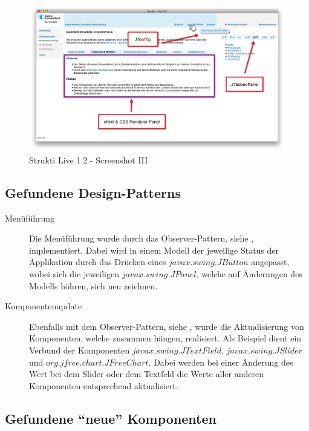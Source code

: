   \begin{figure}[htb]
    \begin{center}
      \includegraphics[width=\textwidth]{./image/SL/SL-03.png}
      \caption{Strukti Live 1.2 - Screenshot III}
      \label{img:SL-03}
    \end{center}
  \end{figure}
  
  \subsection{Gefundene Design-Patterns}
  
  \begin{description}
    \item[Menüführung]
    Die Menüführung wurde durch das Observer-Pattern, siehe
    \cite{ObserverDesignPattern}, implementiert. Dabei wird in einem Modell
    der jeweilige Status der Applikation durch das Drücken eines
    \(javax.swing.JButton\) angepasst, wobei sich die jeweiligen
    \(javax.swing.JPanel\), welche auf Änderungen des Modells höhren, sich neu
    zeichnen.
    \item[Komponentenupdate]
    Ebenfalls mit dem Observer-Pattern, siehe \cite{ObserverDesignPattern},
    wurde die Aktualisierung von Komponenten, welche zusammen hängen,
    realisiert. Als Beispiel dient ein Verbund der Komponenten
    \(javax.swing.JTextField\), \(javax.swing.JSlider\) und
    \(org.jfree.chart.JFreeChart\). Dabei werden bei einer Änderung des Wert bei
    dem Slider oder dem Textfeld die Werte aller anderen Komponenten
    entsprechend aktualisiert.
  \end{description}
  
  \subsection{Gefundene ``neue'' Komponenten}
  
